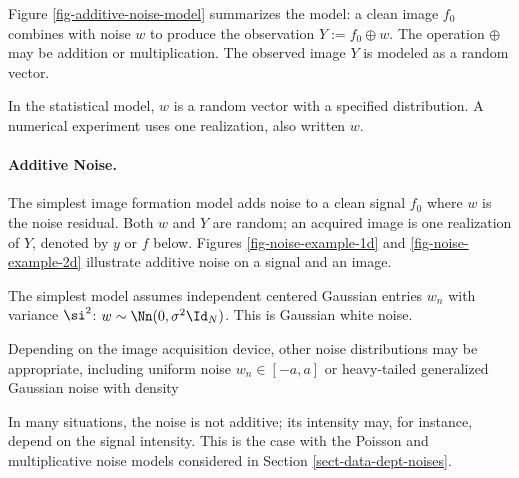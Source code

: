 Figure \ref{fig-additive-noise-model} summarizes the model: a clean image $f_0$ combines with noise $w$ to produce the observation $Y := f_0 \oplus w$. The operation $\oplus$ may be addition or multiplication. The observed image $Y$ is modeled as a random vector.


In the statistical model, $w$ is a random vector with a specified distribution. A numerical experiment uses one realization, also written $w$.

\paragraph{Additive Noise.}

The simplest image formation model adds noise to a clean signal $f_0$
where $w$ is the noise residual. Both $w$ and $Y$ are random; an acquired image is one realization of $Y$, denoted by $y$ or $f$ below. Figures \ref{fig-noise-example-1d} and \ref{fig-noise-example-2d} illustrate additive noise on a signal and an image.




The simplest model assumes independent centered Gaussian entries $w_n$ with variance $\si^2$: $w\sim\Nn(0,\sigma^2\Id_N)$. This is Gaussian white noise.

Depending on the image acquisition device, other noise distributions may be appropriate, including uniform noise $w_n \in [-a,a]$ or heavy-tailed generalized Gaussian noise with density

In many situations, the noise is not additive; its intensity may, for instance, depend on the signal intensity. This is the case with the Poisson and multiplicative noise models considered in Section \ref{sect-data-dept-noises}.


